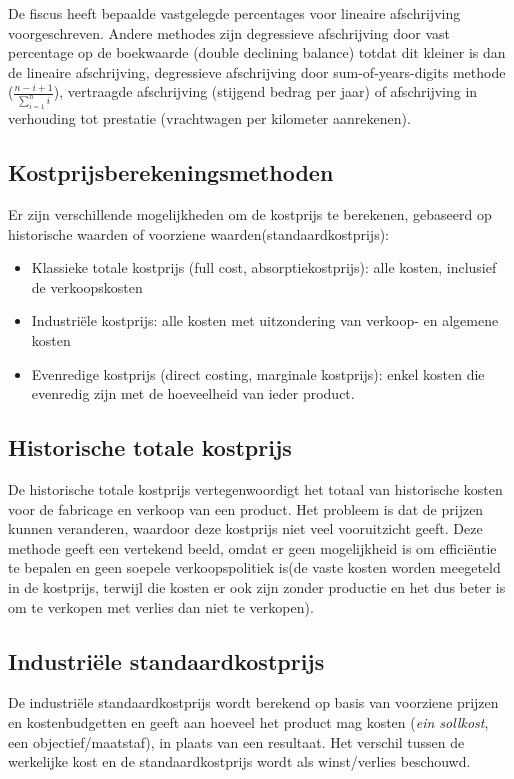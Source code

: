 \documentclass[../../samenvatting.tex]{subfiles}
\begin{document}
De fiscus heeft bepaalde vastgelegde percentages voor lineaire afschrijving voorgeschreven. Andere methodes zijn degressieve afschrijving door vast percentage op de boekwaarde (double declining balance) totdat dit kleiner is dan de lineaire afschrijving, degressieve afschrijving door sum-of-years-digits methode ($\frac{n-i+1}{\sum_{i=1}^{n}i}$), vertraagde afschrijving (stijgend bedrag per jaar) of afschrijving in verhouding tot prestatie (vrachtwagen per kilometer aanrekenen).

\subsection{Kostprijsberekeningsmethoden}

Er zijn verschillende mogelijkheden om de kostprijs te berekenen, gebaseerd op historische waarden of voorziene waarden(standaardkostprijs):
\begin{itemize}
    \item Klassieke totale kostprijs (full cost, absorptiekostprijs): alle kosten, inclusief de verkoopskosten
    \item Industriële kostprijs: alle kosten met uitzondering van verkoop- en algemene kosten
    \item Evenredige kostprijs (direct costing, marginale kostprijs): enkel kosten die evenredig zijn met de hoeveelheid van ieder product.
\end{itemize}

\subsection{Historische totale kostprijs}
De historische totale kostprijs vertegenwoordigt het totaal van historische kosten voor de fabricage en verkoop van een product. Het probleem is dat de prijzen kunnen veranderen, waardoor deze kostprijs niet veel vooruitzicht geeft. Deze methode geeft een vertekend beeld, omdat er geen mogelijkheid is om efficiëntie te bepalen en geen soepele verkoopspolitiek is(de vaste kosten worden meegeteld in de kostprijs, terwijl die kosten er ook zijn zonder productie en het dus beter is om te verkopen met verlies dan niet te verkopen).

\subsection{Industriële standaardkostprijs}
De industriële standaardkostprijs wordt berekend op basis van voorziene prijzen en kostenbudgetten en geeft aan hoeveel het product mag kosten (\emph{ein sollkost}, een objectief/maatstaf), in plaats van een resultaat. Het verschil tussen de werkelijke kost en de standaardkostprijs wordt als winst/verlies beschouwd.
\end{document}
